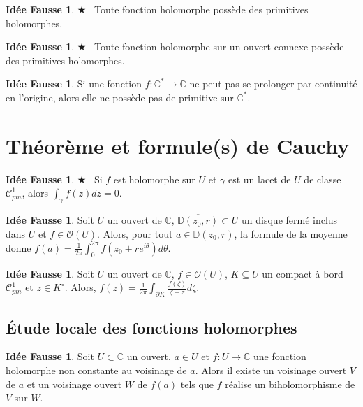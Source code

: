 \documentclass[11pt,a4paper]{article}
\newcommand{\D}{\mathbb{D}}
\newcommand{\C}{\mathbb{C}}
\theoremstyle{definition}
\newtheorem{ideeFausse}[theoreme]{Idée Fausse}
\theoremstyle{plain}
\newcommand{\important}{$\bigstar$~}
\begin{document}
\begin{ideeFausse}\important 
Toute fonction holomorphe possède des primitives holomorphes.
\end{ideeFausse}

\begin{ideeFausse}\important 
Toute fonction holomorphe sur un ouvert connexe possède des primitives holomorphes.
\end{ideeFausse}

\begin{ideeFausse}
Si une fonction $f : \C^*\to \C$ ne peut pas se prolonger par continuité en l'origine, alors elle ne possède pas de primitive sur $\C^*$.
\end{ideeFausse}



\section{Théorème et formule(s) de Cauchy}

\begin{ideeFausse}\important 
Si $f$ est holomorphe sur $U$ et $\gamma$ est un lacet de $U$ de classe $\mathcal C^1_{pm}$, alors $\int_\gamma f(z)dz=0$.
\end{ideeFausse}

\begin{ideeFausse}
Soit $U$ un ouvert de $\C$, $\overline{\D(z_0,r)} \subset U$ un disque fermé inclus dans $U$ et $f\in \mathcal O(U)$.
Alors, pour tout $a \in \D(z_0,r)$, la formule de la moyenne donne $f(a) = \frac{1}{2\pi}\int_0^{2\pi} f\left(z_0+re^{i\theta}\right)d\theta$.
\end{ideeFausse}

\begin{ideeFausse}
Soit $U$ un ouvert de $\C$, $f\in \mathcal O(U)$, $K\subseteq U$ un compact à bord $\mathcal C^1_{pm}$ et $z\in K^\circ$.
Alors, $f(z) =\frac{1}{2\pi} \int_{\partial K}\frac{f(\zeta)}{\zeta-z}d\zeta $.
\end{ideeFausse}

\subsection{Étude locale des fonctions holomorphes}


\begin{ideeFausse}
Soit $U\subset \C$ un ouvert, $a\in U$ et $f : U\to \C$ une fonction holomorphe non constante au voisinage de $a$.
Alors il existe un voisinage ouvert $V$ de $a$ et un voisinage ouvert $W$ de $f(a)$ tels que $f$ réalise un biholomorphisme de $V$ sur $W$.
\end{ideeFausse}
\end{document}
